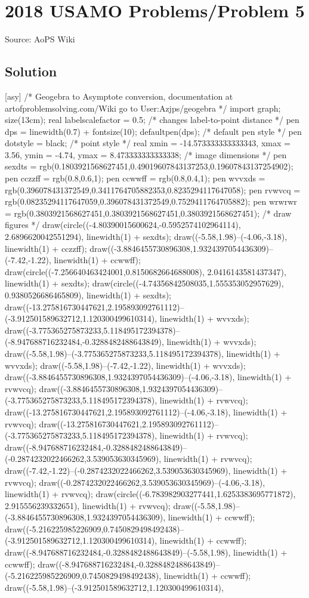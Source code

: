 \documentclass[12pt]{article}
\begin{document}
\section*{{2018 USAMO Problems/Problem 5}}
Source: AoPS Wiki

\subsection*{Solution}
[asy] /* Geogebra to Asymptote conversion, documentation at artofproblemsolving.com/Wiki go to User:Azjps/geogebra */ import graph; size(13cm); real labelscalefactor = 0.5; /* changes label-to-point distance */ pen dps = linewidth(0.7) + fontsize(10); defaultpen(dps); /* default pen style */ pen dotstyle = black; /* point style */ real xmin = -14.573333333333343, xmax = 3.56, ymin = -4.74, ymax = 8.473333333333338; /* image dimensions */ pen sexdts = rgb(0.1803921568627451,0.49019607843137253,0.19607843137254902); pen cczzff = rgb(0.8,0.6,1); pen ccwwff = rgb(0.8,0.4,1); pen wvvxds = rgb(0.396078431372549,0.3411764705882353,0.8235294117647058); pen rvwvcq = rgb(0.08235294117647059,0.396078431372549,0.7529411764705882); pen wrwrwr = rgb(0.3803921568627451,0.3803921568627451,0.3803921568627451); /* draw figures */ draw(circle((-4.80390015600624,-0.5952574102964114), 2.6896620042551294), linewidth(1) + sexdts); draw((-5.58,1.98)--(-4.06,-3.18), linewidth(1) + cczzff); draw((-3.8846455730896308,1.9324397054436309)--(-7.42,-1.22), linewidth(1) + ccwwff); draw(circle((-7.256640463424001,0.8150682664688008), 2.0416143581437347), linewidth(1) + sexdts); draw(circle((-4.74356842508035,1.555353052957629), 0.9380526686465809), linewidth(1) + sexdts); draw((-13.275816730447621,2.195893092761112)--(-3.912501589632712,1.120300499610314), linewidth(1) + wvvxds); draw((-3.775365275873233,5.118495172394378)--(-8.947688716232484,-0.3288482488643849), linewidth(1) + wvvxds); draw((-5.58,1.98)--(-3.775365275873233,5.118495172394378), linewidth(1) + wvvxds); draw((-5.58,1.98)--(-7.42,-1.22), linewidth(1) + wvvxds); draw((-3.8846455730896308,1.9324397054436309)--(-4.06,-3.18), linewidth(1) + rvwvcq); draw((-3.8846455730896308,1.9324397054436309)--(-3.775365275873233,5.118495172394378), linewidth(1) + rvwvcq); draw((-13.275816730447621,2.195893092761112)--(-4.06,-3.18), linewidth(1) + rvwvcq); draw((-13.275816730447621,2.195893092761112)--(-3.775365275873233,5.118495172394378), linewidth(1) + rvwvcq); draw((-8.947688716232484,-0.3288482488643849)--(-0.2874232022466262,3.539053630345969), linewidth(1) + rvwvcq); draw((-7.42,-1.22)--(-0.2874232022466262,3.539053630345969), linewidth(1) + rvwvcq); draw((-0.2874232022466262,3.539053630345969)--(-4.06,-3.18), linewidth(1) + rvwvcq); draw(circle((-6.783982903277441,1.6253383695771872), 2.915556239332651), linewidth(1) + rvwvcq); draw((-5.58,1.98)--(-3.8846455730896308,1.9324397054436309), linewidth(1) + ccwwff); draw((-5.216225985226909,0.7450829498492438)--(-3.912501589632712,1.120300499610314), linewidth(1) + ccwwff); draw((-8.947688716232484,-0.3288482488643849)--(-5.58,1.98), linewidth(1) + ccwwff); draw((-8.947688716232484,-0.3288482488643849)--(-5.216225985226909,0.7450829498492438), linewidth(1) + ccwwff); draw((-5.58,1.98)--(-3.912501589632712,1.120300499610314), 
\end{document}
